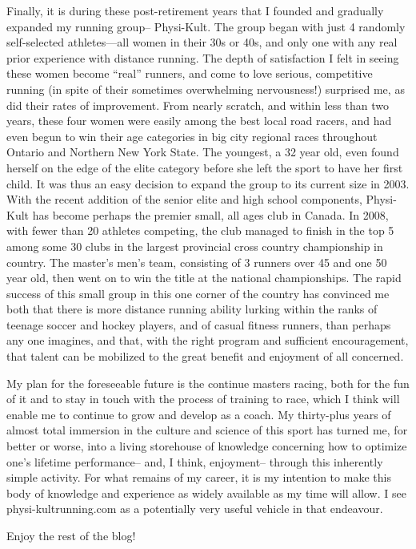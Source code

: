 Finally, it is during these post-retirement years that I founded and gradually expanded my running group-- Physi-Kult. The group began with just 4 randomly self-selected athletes—all women in their 30s or 40s, and only one with any real prior experience with distance running. The depth of satisfaction I felt in seeing these women become “real” runners, and come to love serious, competitive running (in spite of their sometimes overwhelming nervousness!) surprised me, as did their rates of improvement. From nearly scratch, and within less than two years, these four women were easily among the best local road racers, and had even begun to win their age categories in big city regional races throughout Ontario and Northern New York State. The youngest, a 32 year old, even found herself on the edge of the elite category before she left the sport to have her first child. It was thus an easy decision to expand the group to its current size in 2003. With the recent addition of the senior elite and high school components, Physi-Kult has become perhaps the premier small, all ages club in Canada. In 2008, with fewer than 20 athletes competing, the club managed to finish in the top 5 among some 30 clubs in the largest provincial cross country championship in country. The master’s men’s team, consisting of 3 runners over 45 and one 50 year old, then went on to win the title at the national championships. The rapid success of this small group in this one corner of the country has convinced me both that there is more distance running ability lurking within the ranks of teenage soccer and hockey players, and of casual fitness runners, than perhaps any one imagines, and that, with the right program and sufficient encouragement, that talent can be mobilized to the great benefit and enjoyment of all concerned.


My plan for the foreseeable future is the continue masters racing, both for the fun of it and to stay in touch with the process of training to race, which I think will enable me to continue to grow and develop as a coach. My thirty-plus years of almost total immersion in the culture and science of this sport has turned me, for better or worse, into a living storehouse of knowledge concerning how to optimize one’s lifetime performance-- and, I think, enjoyment-- through this inherently simple activity. For what remains of my career, it is my intention to make this body of knowledge and experience as widely available as my time will allow. I see physi-kultrunning.com as a potentially very useful vehicle in that endeavour.

\bigskip

Enjoy the rest of the blog!

